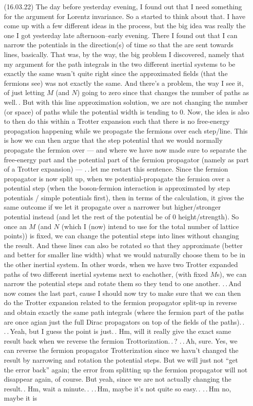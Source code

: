 \documentclass{report}
\begin{document}
(16.03.22) The day before yesterday evening, I found out that I need something for the argument for Lorentz invariance. So a started to think about that. I have come up with a few different ideas in the process, but the big idea was really the one I got yesterday late afternoon--early evening. There I found out that I can narrow the potentials in the direction(s) of time so that the are sent towards lines, basically. That was, by the way, the big problem I discovered, namely that my argument for the path integrals in the two different inertial systems to be exactly the same wasn't quite right since the approximated fields (that the fermions see) was not exactly the same. And there's a problem, the way I see it, of just letting $M$ (and $N$) going to zero since that changes the number of paths as well.\,. But with this line approximation solution, we are not changing the number (or space) of paths while the potential width is tending to 0. Now, the idea is also to then do this within a Trotter expansion such that there is no free-energy propagation happening while we propagate the fermions over each step/line. This is how we can then argue that the step potential that we would normally propagate the fermion over --- and where we have now made sure to separate the free-energy part and the potential part of the fermion propagator (namely as part of a Trotter expansion) --- .\,.\,let me restart this sentence. Since the fermion propagator is now split up, when we potential-propagate the fermion over a potential step (when the boson-fermion interaction is approximated by step potentials / simple potentials first), then in terms of the calculation, it gives the same outcome if we let it propagate over a narrower but higher/stronger potential instead (and let the rest of the potential be of 0 height/strength). So once an $M$ (and $N$ (which I (now) intend to use for the total number of lattice points)) is fixed, we can change the potential steps into lines without changing the result. And these lines can also be rotated so that they approximate (better and better for smaller line width) what we would naturally choose them to be in the other inertial system. In other words, when we have two Trotter expanded paths of two different inertial systems next to eachother, (with fixed $M$s), we can narrow the potential steps and rotate them so they tend to one another. .\,.\,And now comes the last part, cause I should now try to make sure that we can then do the Trotter expansion related to the fermion propagator split-up in reverse and obtain exactly the same path integrals (where the fermion part of the paths are once agian just the full Dirac propagators on top of the fields of the paths).\,. .\,.\,Yeah, but I guess the point is just.\,. Hm, will it really give the exact same result back when we reverse the fermion Trottorization.\,.\,? .\,.\,Ah, sure. Yes, we can reverse the fermion propagator Trotterization since we havn't changed the result by narrowing and rotation the potential steps. But we will just not ``get the error back'' again; the error from splitting up the fermion propagator will not disappear again, of course. But yeah, since we are not actually changing the result.\,. Hm, wait a minute.\,. .\,.\,Hm, maybe it's not quite so easy.\,. .\,.\,Hm no, maybe it is 
\end{document}
